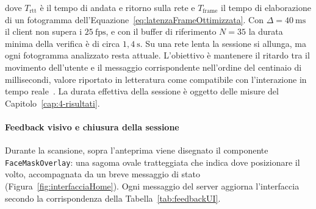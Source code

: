 dove $T_{\text{rtt}}$ è il tempo di andata e ritorno sulla rete e $T_{\text{frame}}$ il tempo di elaborazione di un fotogramma dell'Equazione~\eqref{eq:latenzaFrameOttimizzata}.
Con $\Delta = 40~\text{ms}$ il client non supera i $25~\text{fps}$, e con il buffer di riferimento $N = 35$ la durata minima della verifica è di circa $1{,}4~\text{s}$. Su una rete lenta la sessione si allunga, ma ogni fotogramma analizzato resta attuale.
L'obiettivo è mantenere il ritardo tra il movimento dell'utente e il messaggio corrispondente nell'ordine del centinaio di millisecondi, valore riportato in letteratura come compatibile con l'interazione in tempo reale~\cite{RealtimeBiometricAutthentication}.
La durata effettiva della sessione è oggetto delle misure del Capitolo~\ref{cap:4-risultati}.

\paragraph{Feedback visivo e chiusura della sessione}
Durante la scansione, sopra l'anteprima viene disegnato il componente \texttt{FaceMaskOverlay}: una sagoma ovale tratteggiata che indica dove posizionare il volto, accompagnata da un breve messaggio di stato (Figura~\ref{fig:interfacciaHome}).
Ogni messaggio del server aggiorna l'interfaccia secondo la corrispondenza della Tabella~\ref{tab:feedbackUI}.

